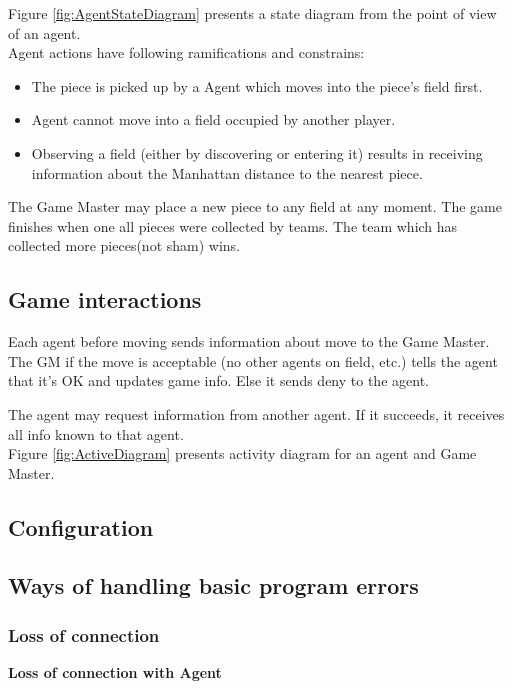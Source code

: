 \documentclass[11pt,a4paper]{article}
\begin{document}
Figure \ref{fig:AgentStateDiagram} presents a state diagram from the point of view of an agent. \\

Agent actions have following ramifications and constrains:
\begin{itemize}


\item The piece is picked up by a Agent which moves into the piece’s field first.
\item Agent cannot move into a field occupied by another player.
\item Observing a field (either by discovering or entering it) results in receiving
information about the Manhattan distance to the nearest piece.
\end{itemize}

The Game Master may place a new piece to any field at any moment. The game finishes when one all pieces were collected by teams. The team which has collected more pieces(not sham) wins.
\subsection{Game interactions}
Each agent before moving sends information about move to the Game Master. The GM if the move is acceptable (no other agents on field, etc.) tells the agent that it's OK and updates game info. Else it sends deny to the agent. 

The agent may request information from another agent. If it succeeds, it receives all info known to that agent.\\

Figure \ref{fig:ActiveDiagram} presents activity diagram for an agent and Game Master.

\subsection{Configuration}



\newpage
\subsection{Ways of handling basic program errors}
\subsubsection{Loss of connection}

\begin{center}
{\bf Loss of connection with Agent}\\
\end{center}
\end{document}
